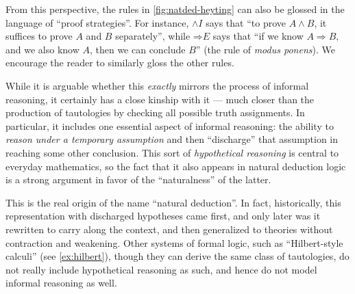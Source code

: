 \documentclass{book}
\let\meet\wedge
\def\meetI{\mathord{\meet}I}
\let\To\Rightarrow
\def\ToE{\mathord{\To}E}
\begin{document}
From this perspective, the rules in \cref{fig:natded-heyting} can also be glossed in the language of ``proof strategies''.
For instance, $\meetI$ says that ``to prove $A\meet B$, it suffices to prove $A$ and $B$ separately'', while $\ToE$ says that ``if we know $A\To B$, and we also know $A$, then we can conclude $B$'' (the rule of \textit{modus ponens}).
We encourage the reader to similarly gloss the other rules.

While it is arguable whether this \emph{exactly} mirrors the process of informal reasoning, it certainly has a close kinship with it --- much closer than the production of tautologies by checking all possible truth assignments.
In particular, it includes one essential aspect of informal reasoning: the ability to \emph{reason under a temporary assumption} and then ``discharge'' that assumption in reaching some other conclusion.
This sort of \emph{hypothetical reasoning} is central to everyday mathematics, so the fact that it also appears in natural deduction logic is a strong argument in favor of the ``naturalness'' of the latter.

This is the real origin of the name ``natural deduction''.
In fact, historically, this representation with discharged hypotheses came first, and only later was it rewritten to carry along the context, and then generalized to theories without contraction and weakening.
Other systems of formal logic, such as ``Hilbert-style calculi'' (see \cref{ex:hilbert}), though they can derive the same class of tautologies, do not really include hypothetical reasoning as such, and hence do not model informal reasoning as well.
\end{document}
